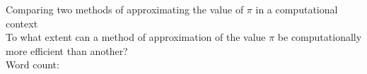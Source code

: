 \documentclass[12pt,a4paper]{article}
\begin{document}
\doublespacing %


\begin{titlepage}
    \begin{center}
    \vspace*{4cm}
        Comparing two methods of approximating the value of $\pi$ in a
        computational context\\
    \vspace{1cm}
    To what extent can a method of approximation of the value $\pi$ be computationally more efficient than another? \\
    \vspace{4cm}
    Word count: 
    \vfill
    \vspace{0.1cm}
    \end{center}
    \end{titlepage}



\begin{center}
\tableofcontents
\vspace{1in}

\end{center}




\newpage













\printbibliography[heading=bibintoc, title=Works Cited]
\end{document}
